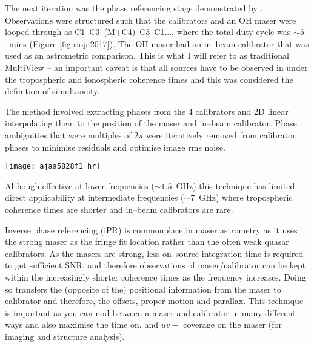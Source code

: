 	The next iteration was the phase referencing stage demonstrated by \citet{Rioja2017}. Observations were structured such that the calibrators and an OH maser were looped through as C1--C3--(M+C4)--C3--C1..., where the total duty cycle was $\sim5$~mins (\hyperref[fig:rioja2017]{Figure \ref*{fig:rioja2017}}). The OH maser had an in--beam calibrator that was used as an astrometric comparison. This is what I will refer to as traditional MultiView -- an important caveat is that all sources have to be observed in under the tropospheric and ionospheric coherence times \citep[hence the $5$\,mins; ][]{Orosz2017} and this was considered the definition of simultaneity. 
	
	The method involved extracting phases from the 4 calibrators and 2D linear interpolating them to the position of the maser and in--beam calibrator. Phase ambiguities that were multiples of $2\pi$ were iteratively removed from calibrator phases to minimise residuals and optimise image rms noise.
	\begin{SCfigure}[][h]
		\centering
		\texttt{[image: ajaa5828f1\_hr]}
		\caption[Figure 1. \citet{Rioja2017}]{\citet{Rioja2017} Figure 1. Original caption: \textit{Sky distribution of the sources observed with the VLBA at 1.6 GHz ... Dashed lines and arrows mark the source switching order during the observations with 5 minute duty cycles. Star and solid symbols mark the simultaneously observed OH–C4 pair, with the VLBA antennas pointed halfway between the two. The two concentric circles represent the half-power beam width and full beam width of the antennas. Both OH and C4 are targets in the astrometric analyses ... C1 was used as the fringe finder.}} \label{fig:rioja2017}
	\end{SCfigure}
	Although effective at lower frequencies ($\sim1.5$~GHz) this technique has limited direct applicability at intermediate frequencies ($\sim7$~GHz) where tropospheric coherence times are shorter and in--beam calibrators are rare.
	
	Inverse phase referencing (iPR) is commonplace in maser astrometry as it uses the strong maser as the fringe fit location rather than the often weak quasar calibrators. As the masers are strong, less on--source integration time is required to get sufficient SNR, and therefore observations of maser/calibrator can be kept within the increasingly shorter coherence times as the frequency increases. Doing so transfers the (opposite of the) positional information from the maser to calibrator and therefore, the offsets, proper motion and parallax. This technique is important as you can nod between a maser and calibrator in many different ways and also maximise the time on, and $uv-$ coverage on the maser (for imaging and structure analysis).
	

